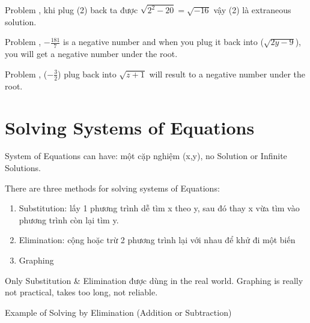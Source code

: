 Problem , khi plug (2) back ta được $\sqrt{2^{2}-20}=\sqrt{-16}$ vậy (2) là extraneous solution.

Problem , $-\frac{181}{7}$ is a negative number and when you plug it back into ($\sqrt{2y-9}$), you will get a negative number under the root.

Problem , ($-\frac{3}{2}$) plug back into $\sqrt{z+1}$ will result to a negative number under the root.

\section{Solving Systems of Equations}

%
%

System of Equations can have: một cặp nghiệm (x,y), no Solution or Infinite Solutions.

\vspace{.4cm}

There are three methods for solving systems of Equations:

\begin{enumerate}
  \item Substitution: lấy 1 phương trình dễ tìm x theo y, sau đó thay x vừa tìm vào phương trình còn lại tìm y.
  \item Elimination: cộng hoặc trừ 2 phương trình lại với nhau để khử đi một biến
  \item Graphing
\end{enumerate}

Only Substitution \& Elimination được dùng in the real world. Graphing is really not practical, takes too long, not reliable.


Example of Solving by Elimination (Addition or Subtraction)

